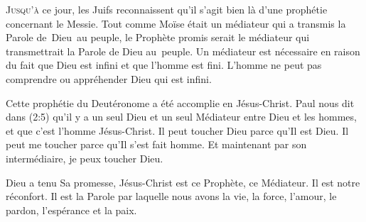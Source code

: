 



\lettrine{J}{usqu'à} ce jour, les Juifs reconnaissent
 qu'il s'agit bien là d'une prophétie concernant le Messie.
 Tout comme Moïse était un médiateur qui a transmis la Parole de~Dieu~au peuple,
 le Prophète promis serait le médiateur qui transmettrait la Parole de Dieu
 au~peuple.
 Un médiateur est nécessaire en raison du fait que Dieu est infini
 et que l'homme est fini.
 L'homme ne peut pas comprendre ou appréhender Dieu qui est infini.


Cette prophétie du Deutéronome a été accomplie en Jésus-Christ.
 Paul nous dit dans (2:5)
 qu'il y a un seul Dieu
 et un seul Médiateur entre Dieu et les hommes,
 et que c'est l'homme Jésus-Christ. Il peut toucher Dieu parce qu'Il est Dieu.
 Il peut me toucher parce qu'Il s'est fait homme.
 Et maintenant par son intermédiaire, je peux toucher Dieu.

Dieu a tenu Sa promesse, Jésus-Christ est ce Prophète, ce Médiateur.
 Il est notre réconfort. Il est la Parole par laquelle nous avons la vie,
 la force, l'amour, le pardon, l'espérance et la paix. 

\dvrule



